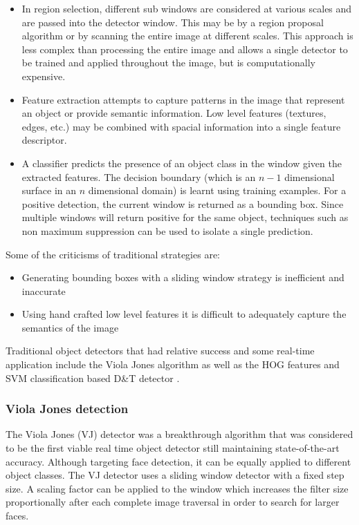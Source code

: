 \documentclass[a4paper,twoside,12pt]{report}
\begin{document}
\begin{itemize}
    \item In region selection, different sub windows are considered at various scales and are passed into the detector window. This may be by a region proposal algorithm or by scanning the entire image at different scales. This approach is less complex than processing the entire image and allows a single detector to be trained and applied throughout the image, but is computationally expensive. 
    \item Feature extraction attempts to capture patterns in the image that represent an object or provide semantic information. Low level features (textures, edges, etc.) may be combined with spacial information into a single feature descriptor.
    \item A classifier predicts the presence of an object class in the window given the extracted features. The decision boundary (which is an $n-1$ dimensional surface in an $n$ dimensional domain) is learnt using training examples. For a positive detection, the current window is returned as a bounding box. Since multiple windows will return positive for the same object, techniques such as non maximum suppression can be used to isolate a single prediction.
\end{itemize}

\noindent Some of the criticisms of traditional strategies are: 
\begin{itemize}
    \setlength\itemsep{0em}
    \item Generating bounding boxes with a sliding window strategy is inefficient and inaccurate
    \item Using hand crafted low level features it is difficult to adequately capture the semantics of the image 
\end{itemize}

Traditional object detectors that had relative success and some real-time application include the Viola Jones algorithm \citep{vjdet} as well as the HOG features and SVM classification based D\&T detector \citep{hog}. 

\subsubsection{Viola Jones detection}

The Viola Jones (VJ) detector \cite{vjdet} was a breakthrough algorithm that was considered to be the first viable real time object detector still maintaining state-of-the-art accuracy. Although targeting face detection, it can be equally applied to different object classes. The VJ detector uses a sliding window detector with a fixed step size. A scaling factor can be applied to the window which increases the filter size proportionally after each complete image traversal in order to search for larger faces. 
\end{document}
